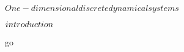 \documentclass[../Main/main]{subfiles}
\begin{document}
\unit{ $ One-dimensional discrete dynamical systems $ }
{
	\introduction
	{ 
		$introduction\\$ 
	}

	go

}
\end{document}
